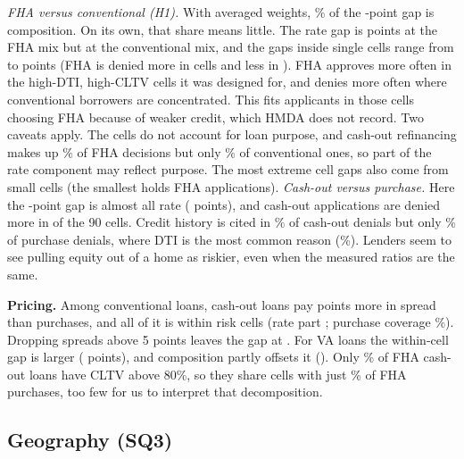 \documentclass[acmtog,nonacm]{acmart}
\begin{document}
\emph{FHA versus conventional (H1).} With averaged weights, \kgFHAcompShare\% of the \kgFHAgap{}-point gap is composition. On its own, that share means little. The rate gap is \kgFHAatFHA{} points at the FHA mix but \kgFHAatConv{} at the conventional mix, and the gaps inside single cells range from \kgFHAmin{} to \kgFHAmax{} points (FHA is denied more in \kgFHAhigher{} cells and less in \kgFHAlower). FHA approves more often in the high-DTI, high-CLTV cells it was designed for, and denies more often where conventional borrowers are concentrated. This fits applicants in those cells choosing FHA because of weaker credit, which HMDA does not record. Two caveats apply. The cells do not account for loan purpose, and cash-out refinancing makes up \coShareFHA\% of FHA decisions but only \coShareConv\% of conventional ones, so part of the rate component may reflect purpose. The most extreme cell gaps also come from small cells (the smallest holds \minFHAcell{} FHA applications). \emph{Cash-out versus purchase.} Here the \kgCOgap{}-point gap is almost all rate (\kgCOrate{} points), and cash-out applications are denied more in \kgCOhigher{} of the 90 cells. Credit history is cited in \creditCashout\% of cash-out denials but only \creditPurchase\% of purchase denials, where DTI is the most common reason (\dtiReasonPurchase\%). Lenders seem to see pulling equity out of a home as riskier, even when the measured ratios are the same.

\textbf{Pricing.} Among conventional loans, cash-out loans pay \psCOconvGap{} points more in spread than purchases, and all of it is within risk cells (rate part \psCOconvRate{}; purchase coverage \psCOconvCov\%). Dropping spreads above 5 points leaves the gap at \psCOconvGapFive. For VA loans the within-cell gap is larger (\psCOvaRate{} points), and composition partly offsets it (\psCOvaComp). Only \fhaCashoutGtEighty\% of FHA cash-out loans have CLTV above 80\%, so they share cells with just \psCOfhaCov\% of FHA purchases, too few for us to interpret that decomposition.

\subsection{Geography (SQ3)}
\end{document}
